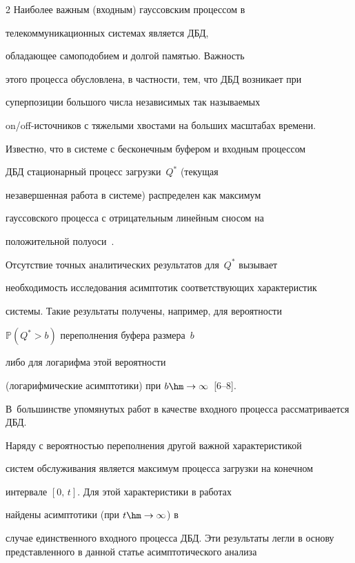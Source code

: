 \begin{multicols}{2}
Наиболее важным (входным) гауссовским процессом в


телекоммуникационных системах  является ДБД, 


обла\-да\-ющее самоподобием и  долгой памятью. Важность


этого процесса обусловлена, в  частности, тем, что ДБД возникает при


суперпозиции большого числа независимых так называемых


on/off-источников с тяжелыми хвостами на больших масштабах времени.





Известно, что в  системе с  бесконечным буфером и входным процессом


ДБД  стационарный процесс загрузки~$Q^*$ (текущая


незавершенная работа в системе) распределен как  максимум


гауссовского процесса с отрицательным линейным сносом на


положительной полуоси~\cite{Reich}.





Отсутствие точных аналитических результатов для~$Q^*$ вызывает


необходимость исследования асимптотик соответствующих характеристик


системы. Такие результаты получены, например, для ве\-ро\-ят\-ности


$\mathbb{P}\left(Q^*>b \right)$ переполнения буфера размера~$b$~\cite{Narayan, Husler} 


либо для логарифма этой ве\-ро\-ят\-ности


(логарифмические асимптотики) при  $ b \hm\to \infty$~[6--8]. 


В~большинстве  упомянутых  работ в качестве входного процесса рассматривается  ДБД.





Наряду с вероятностью переполнения другой важной характеристикой


систем обслуживания является максимум процесса загрузки на конечном


интервале $[0,\,t]$. Для этой характеристики в работах~\cite{Zeevi, Husler1} 


найдены асимптотики (при   $t\hm\to \infty$)  в


случае единственного входного процесса ДБД. Эти результаты легли в основу представленного в данной статье асимптотического анализа



\end{multicols}
